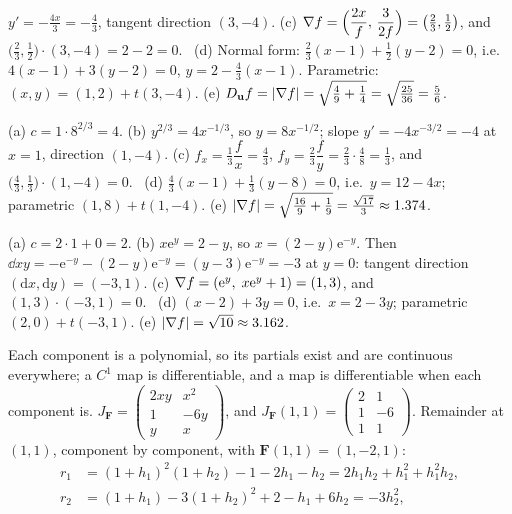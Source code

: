 \begin{solutions}
        $y'=-\tfrac{4x}{3}=-\tfrac43$, tangent direction $(3,-4)$.
        (c) $\nabla f=\Bigl(\dfrac{2x}{f},\,\dfrac{3}{2f}\Bigr)=
        \bigl(\tfrac23,\tfrac12\bigr)$, and
        $\bigl(\tfrac23,\tfrac12\bigr)\cdot(3,-4)=2-2=0$. \checkmark\ (d)
        Normal form: $\tfrac23(x-1)+\tfrac12(y-2)=0$, i.e.\
        $4(x-1)+3(y-2)=0$, $y=2-\tfrac43(x-1)$. Parametric:
        $(x,y)=(1,2)+t(3,-4)$. (e) $D_{\mathbf{u}}f=|\nabla f|=
        \sqrt{\tfrac49+\tfrac14}=\sqrt{\tfrac{25}{36}}=\tfrac56$.
  \item (a) $c=1\cdot8^{2/3}=4$. (b) $y^{2/3}=4x^{-1/3}$, so
        $y=8x^{-1/2}$; slope $y'=-4x^{-3/2}=-4$ at $x=1$, direction $(1,-4)$.
        (c) $f_{x}=\tfrac13\dfrac fx=\tfrac43$,
        $f_{y}=\tfrac23\dfrac fy=\tfrac23\cdot\tfrac48=\tfrac13$, and
        $\bigl(\tfrac43,\tfrac13\bigr)\cdot(1,-4)=0$. \checkmark\ (d)
        $\tfrac43(x-1)+\tfrac13(y-8)=0$, i.e.\ $y=12-4x$; parametric
        $(1,8)+t(1,-4)$. (e) $|\nabla f|=\sqrt{\tfrac{16}{9}+\tfrac19}=
        \tfrac{\sqrt{17}}{3}\approx1.374$.
  \item (a) $c=2\cdot1+0=2$. (b) $x\mathrm{e}^{y}=2-y$, so
        $x=(2-y)\mathrm{e}^{-y}$. Then
        $\dd{x}{y}=-\mathrm{e}^{-y}-(2-y)\mathrm{e}^{-y}=(y-3)\mathrm{e}^{-y}
        =-3$ at $y=0$: tangent direction $(\mathrm{d}x,\mathrm{d}y)=(-3,1)$.
        (c) $\nabla f=(\mathrm{e}^{y},\;x\mathrm{e}^{y}+1)=(1,3)$, and
        $(1,3)\cdot(-3,1)=0$. \checkmark\ (d) $(x-2)+3y=0$, i.e.\
        $x=2-3y$; parametric $(2,0)+t(-3,1)$. (e) $|\nabla f|=\sqrt{10}
        \approx3.162$.
  \item Each component is a polynomial, so its partials exist and are
        continuous everywhere; a $C^{1}$ map is differentiable, and a map is
        differentiable when each component is.
        $J_{\mathbf{F}}=\begin{pmatrix}2xy&x^{2}\\1&-6y\\y&x\end{pmatrix}$,
        and $J_{\mathbf{F}}(1,1)=\begin{pmatrix}2&1\\1&-6\\1&1\end{pmatrix}$.
        Remainder at $(1,1)$, component by component, with
        $\mathbf{F}(1,1)=(1,-2,1)$:
        \[\begin{aligned}
          r_{1}&=(1+h_{1})^{2}(1+h_{2})-1-2h_{1}-h_{2}
               =2h_{1}h_{2}+h_{1}^{2}+h_{1}^{2}h_{2},\\
          r_{2}&=(1+h_{1})-3(1+h_{2})^{2}+2-h_{1}+6h_{2}=-3h_{2}^{2},\\

\end{aligned}\]
\end{solutions}
